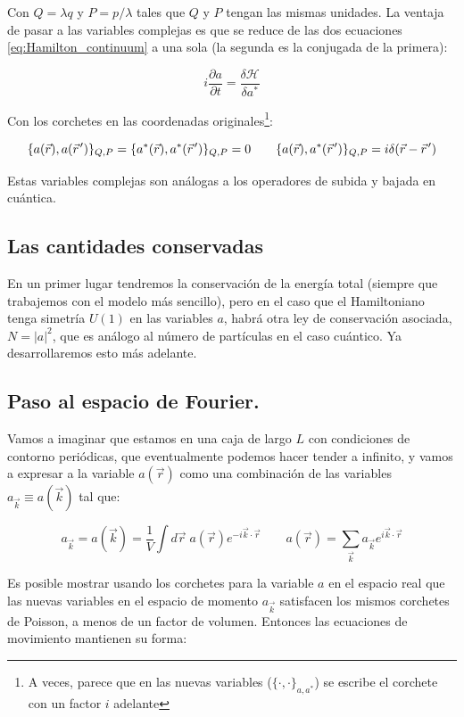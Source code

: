 Con $Q=\lambda q$ y $P=p / \lambda$ tales que $Q$ y $P$ tengan las mismas unidades. La ventaja de pasar a las variables complejas es que se reduce de las dos ecuaciones \eqref{eq:Hamilton_continuum} a una sola (la segunda es la conjugada de la primera):

\begin{equation}
	i\frac{\partial a}{\partial t} = \frac{\delta \mathcal{H}}{\delta a^*}
\end{equation}

Con los corchetes en las coordenadas originales\footnote{A veces, parece que en las nuevas variables ($\{\cdot,\cdot\}_{a,a^*}$) se escribe el corchete con un factor $i$ adelante}:

\begin{equation}
	\{a(\vec r), a(\pvec r')\}_{Q,P} = \{a^*(\vec r), a^*(\pvec r')\}_{Q,P} = 0 \qquad \{a(\vec r), a^*(\pvec r')\}_{Q,P} = i\delta(\vec r - \pvec r')
\end{equation}

Estas variables complejas son análogas a los operadores de subida y bajada en cuántica. 

\subsection*{Las cantidades conservadas}
En un primer lugar tendremos la conservación de la energía total (siempre que trabajemos con el modelo más sencillo), pero en el caso que el Hamiltoniano tenga simetría $U(1)$ en las variables $a$, habrá otra ley de conservación asociada, $N=|a|^2$, que es análogo al número de partículas en el caso cuántico. Ya desarrollaremos esto más adelante. 

\subsection*{Paso al espacio de Fourier.}
Vamos a imaginar que estamos en una caja de largo $L$ con condiciones de contorno periódicas, que eventualmente podemos hacer tender a infinito, y vamos a expresar a la variable $a(\vec r)$ como una combinación de las variables $a_{\vec k} \equiv a(\vec k)$ tal que:

\begin{equation}
	a_{\vec k} = a(\vec k) = \frac{1}{V}\int d\vec r\;a(\vec r)e^{-i\vec k\cdot\vec r} \qquad a(\vec r) = \sum_{\vec k} a_{\vec k} e^{i\vec k\cdot\vec r}
\end{equation}

Es posible mostrar usando los corchetes para la variable $a$ en el espacio real que las nuevas variables en el espacio de momento $a_{\vec k}$ satisfacen los mismos corchetes de Poisson, a menos de un factor de volumen. Entonces las ecuaciones de movimiento mantienen su forma:

